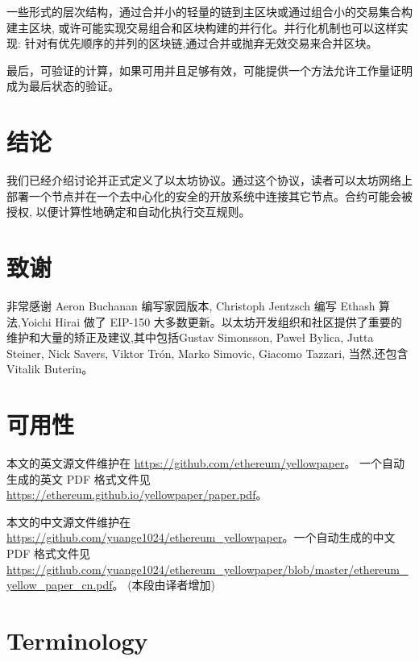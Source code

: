 \documentclass[9pt,oneside]{amsart}
\begin{document}
\begin{multicols}{2}
一些形式的层次结构，通过合并小的轻量的链到主区块或通过组合小的交易集合构建主区块, 或许可能实现交易组合和区块构建的并行化。并行化机制也可以这样实现: 针对有优先顺序的并列的区块链,通过合并或抛弃无效交易来合并区块。

最后，可验证的计算，如果可用并且足够有效，可能提供一个方法允许工作量证明成为最后状态的验证。

\section{结论} \label{ch:conclusion}
我们已经介绍讨论并正式定义了以太坊协议。通过这个协议，读者可以太坊网络上部署一个节点并在一个去中心化的安全的开放系统中连接其它节点。合约可能会被授权, 以便计算性地确定和自动化执行交互规则。

\section{致谢}

非常感谢 Aeron Buchanan 编写家园版本, Christoph Jentzsch 编写 Ethash 算法,Yoichi Hirai 做了 EIP-150 大多数更新。以太坊开发组织和社区提供了重要的维护和大量的矫正及建议,其中包括Gustav Simonsson, Pawe\l{} Bylica, Jutta Steiner, Nick Savers, Viktor Tr\'{o}n, Marko Simovic, Giacomo Tazzari, 当然,还包含Vitalik Buterin。

\section{可用性}
本文的英文源文件维护在 \url{https://github.com/ethereum/yellowpaper}。 一个自动生成的英文 PDF 格式文件见 \url{https://ethereum.github.io/yellowpaper/paper.pdf}。

本文的中文源文件维护在 \url{https://github.com/yuange1024/ethereum_yellowpaper}。一个自动生成的中文 PDF 格式文件见 \url{https://github.com/yuange1024/ethereum_yellowpaper/blob/master/ethereum_yellow_paper_cn.pdf}。 (本段由译者增加)




\end{multicols}

\appendix

\section{Terminology}
\end{document}
